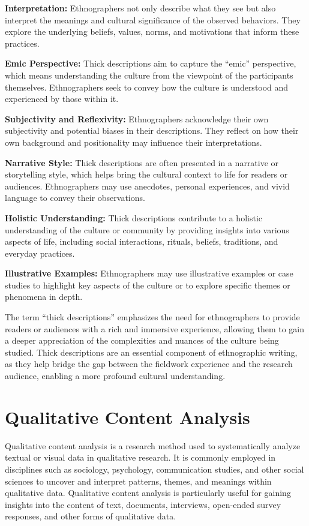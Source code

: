 \documentclass[
  b5paper]{book}
\begin{document}
\textbf{Interpretation:} Ethnographers not only describe what they see but also interpret the meanings and cultural significance of the observed behaviors. They explore the underlying beliefs, values, norms, and motivations that inform these practices.

\textbf{Emic Perspective:} Thick descriptions aim to capture the ``emic'' perspective, which means understanding the culture from the viewpoint of the participants themselves. Ethnographers seek to convey how the culture is understood and experienced by those within it.

\textbf{Subjectivity and Reflexivity:} Ethnographers acknowledge their own subjectivity and potential biases in their descriptions. They reflect on how their own background and positionality may influence their interpretations.

\textbf{Narrative Style:} Thick descriptions are often presented in a narrative or storytelling style, which helps bring the cultural context to life for readers or audiences. Ethnographers may use anecdotes, personal experiences, and vivid language to convey their observations.

\textbf{Holistic Understanding:} Thick descriptions contribute to a holistic understanding of the culture or community by providing insights into various aspects of life, including social interactions, rituals, beliefs, traditions, and everyday practices.

\textbf{Illustrative Examples:} Ethnographers may use illustrative examples or case studies to highlight key aspects of the culture or to explore specific themes or phenomena in depth.

The term ``thick descriptions'' emphasizes the need for ethnographers to provide readers or audiences with a rich and immersive experience, allowing them to gain a deeper appreciation of the complexities and nuances of the culture being studied. Thick descriptions are an essential component of ethnographic writing, as they help bridge the gap between the fieldwork experience and the research audience, enabling a more profound cultural understanding.

\hypertarget{qualitative-content-analysis-1}{%
\chapter{Qualitative Content Analysis}\label{qualitative-content-analysis-1}}

Qualitative content analysis is a research method used to systematically analyze textual or visual data in qualitative research. It is commonly employed in disciplines such as sociology, psychology, communication studies, and other social sciences to uncover and interpret patterns, themes, and meanings within qualitative data. Qualitative content analysis is particularly useful for gaining insights into the content of text, documents, interviews, open-ended survey responses, and other forms of qualitative data.
\end{document}

